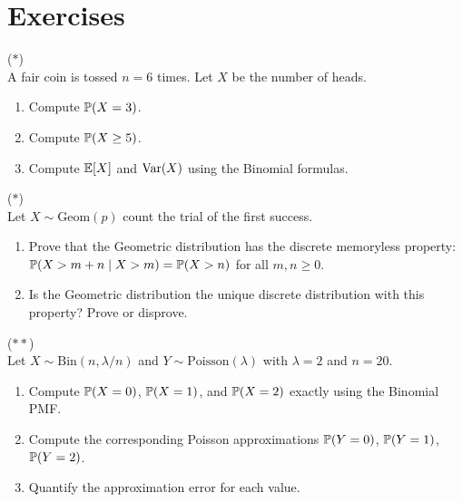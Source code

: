 \documentclass[11pt,a4paper]{article}
\begin{document}

\section{Exercises}
\label{sec:exercises}

\begin{exercise}
\textnormal{(\(\ast\))} \\
A fair coin is tossed $n = 6$ times. Let $X$ be the number of heads.
\begin{enumerate}[nosep,label=(\alph*)]
    \item Compute $\mathbb{P}(X = 3)$.
    \item Compute $\mathbb{P}(X \geq 5)$.
    \item Compute $\mathbb{E}[X]$ and $\operatorname{Var}(X)$ using the Binomial formulas.
\end{enumerate}
\end{exercise}

\begin{exercise}
\textnormal{(\(\ast\))} \\
Let $X \sim \mathrm{Geom}(p)$ count the trial of the first success.
\begin{enumerate}[nosep,label=(\alph*)]
    \item Prove that the Geometric distribution has the discrete
    memoryless property: $\mathbb{P}(X > m + n \mid X > m) = \mathbb{P}(X > n)$
    for all $m, n \geq 0$.
    \item Is the Geometric distribution the unique discrete distribution
    with this property? Prove or disprove.
\end{enumerate}
\end{exercise}

\begin{exercise}
\textnormal{(\(\ast\ast\))} \\
Let $X \sim \mathrm{Bin}(n, \lambda/n)$ and $Y \sim
\mathrm{Poisson}(\lambda)$ with $\lambda = 2$ and $n = 20$.
\begin{enumerate}[nosep,label=(\alph*)]
    \item Compute $\mathbb{P}(X = 0)$, $\mathbb{P}(X = 1)$, and $\mathbb{P}(X = 2)$
    exactly using the Binomial PMF.
    \item Compute the corresponding Poisson approximations
    $\mathbb{P}(Y = 0)$, $\mathbb{P}(Y = 1)$, $\mathbb{P}(Y = 2)$.
    \item Quantify the approximation error for each value.
\end{enumerate}
\end{exercise}
\end{document}
